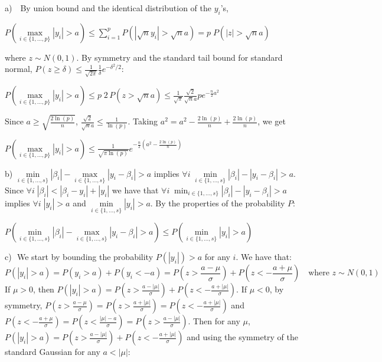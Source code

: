 \documentclass[aos]{imsart}
\theoremstyle{plain}
\begin{document}
\begin{supplement}
	a) \,\, By union bound and the identical distribution of the $y_i$'s,
\begin{center}
    $P\left(\underset{i\in\{1,\ldots,p\}}{\max}|y_i|> a \right)     \leq \sum_{i=1}^{p}{ P\left(|\sqrt{n}y_i|>\sqrt{n}a \right)}
    = p\; P\left(|z|>\sqrt{n}a\right)$
\end{center}
    where $z\sim N(0,1)$. 
    By symmetry and the standard tail bound for standard normal, $P(z \geq \delta) \leq \frac{1}{\sqrt{2\pi}} \frac{1}{\delta} e^{-\delta^{2} / 2}$:
\begin{center}
  $P\left(\underset{i\in\{1,\ldots,p\}}{\max}|y_i|> a \right) 
     \leq  p\; 2 \, P\left(z>\sqrt{n}a\right) \leq \frac{1}{\sqrt{\pi}}\frac{\sqrt{2}}{\sqrt{n}a}p e^{-\frac{n}{2} a^{2}}$
\end{center}
Since $a \geq \sqrt{\frac{2\ln(p)}{n}}$, $\frac{\sqrt{2}}{\sqrt{n}a}\leq \frac{1}{\ln(p)}$. Taking $a^2=a^2-\frac{2\ln(p)}{n}+\frac{2\ln(p)}{n}$, we get \begin{center}
$ P\left(\underset{i\in\{1,\ldots,p\}}{\max}|y_i|> a \right) \leq \frac{1}{\sqrt{\pi\ln(p)}} e^{-\frac{n}{2} \left(a^{2}-\frac{2\ln(p)}{n}\right)}$ \\\end{center}
b) $ \underset{i \in \{1,\ldots,s\}}{\min}|\beta_i|- \underset{i \in \{1,\ldots,s\}}{\max}|y_i-\beta_i| > a$ implies $\forall i \; \underset{i \in \{1,\ldots,s\}}{\min}|\beta_i| - |y_i-\beta_i| > a $. Since $\forall i \; |\beta_i|< |\beta_i-y_i|+|y_i|$ we have that $ \forall i \; \min_{i \in \{1,\ldots,s\}}|\beta_i| - |y_i-\beta_i| > a$ implies $\forall i \; |y_i| > a $ and $ \underset{i \in \{1,\ldots,s\}}{\min}|y_i| > a$. By the properties of the probability $P$: 
\begin{center}$ P\left(\underset{i \in \{1,\ldots,s\}}{\min}|\beta_i|-\underset{i \in \{1,\ldots,s\}}{\max}|y_i-\beta_i| > a\right) \leq P\left(\underset{i \in \{1,\ldots,s\}}{\min}|y_i| > a\right) $ \end{center}
c)\,\, We start by bounding the probability $P(|y_i|)>a$ for any $i$. We have that:
$$P(|y_i|>a) = P(y_i>a) + P(y_i<-a) = P(z>\frac{a-\mu}{\sigma}) + P(z<-\frac{a+\mu}{\sigma}) \quad \text{where }z\sim N(0,1)$$
If $\mu>0$, then $P(|y_i|>a) =  P(z>\frac{a-|\mu|}{\sigma}) + P(z<-\frac{a+|\mu|}{\sigma})$. If $\mu<0$, by symmetry, $P(z>\frac{a-\mu}{\sigma})=P(z>\frac{a+|\mu|}{\sigma})=P(z<-\frac{a+|\mu|}{\sigma})$ and $P(z<-\frac{a+\mu}{\sigma})=P(z<\frac{|\mu|-a}{\sigma})=P(z>\frac{a-|\mu|}{\sigma})$. Then for any $\mu$, $P(|y_i|>a)  = P(z>\frac{a-|\mu|}{\sigma}) + P(z<-\frac{a+|\mu|}{\sigma}) $ and using the symmetry of the standard Gaussian for any $a<|\mu|$: 

\end{supplement}
\end{document}
